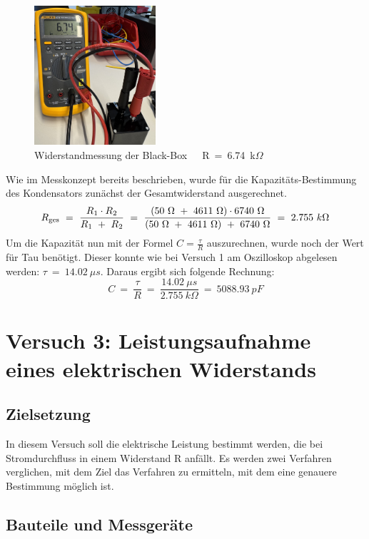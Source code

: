 \documentclass[a4paper,12pt]{article}
\begin{document}
\begin{figure}[H]
    \centering
    \includegraphics[width=0.4\textwidth]{../Quellen/Labor2/Fotos/IMG_3973gezoomt.jpeg}
\caption{Widerstandmessung der Black-Box~~~R~=~6.74~k$\Omega$}
\end{figure}


\noindent Wie im Messkonzept bereits beschrieben, wurde für die Kapazitäts-Bestimmung des Kondensators zunächst der Gesamtwiderstand ausgerechnet.
\[
R\textsubscript{ges}~=~\frac{R\textsubscript{1} \cdot R\textsubscript{2}}{R\textsubscript{1}~+~R\textsubscript{2}}~=~\frac{(50~\Omega~+~4611~\Omega) \cdot 6740~\Omega}{(50~\Omega~+~4611~\Omega)~+~6740~\Omega}~=~2.755~k\Omega
\]
Um die Kapazität nun mit der Formel \(C=\frac{\tau}{R}\) auszurechnen, wurde noch der Wert für Tau benötigt. Dieser konnte wie bei Versuch 1 am Oszilloskop abgelesen werden: $\tau~=~14.02~\mu s$. Daraus ergibt sich folgende Rechnung:
\[
C~=~\frac{\tau}{R}~=~\frac{14.02~\mu s}{2.755~k\Omega}~=~5088.93~pF
\]





\newpage
\section{Versuch 3: Leistungsaufnahme eines elektrischen Widerstands}
\subsection{Zielsetzung}
In diesem Versuch soll die elektrische Leistung bestimmt werden, die bei Stromdurchfluss in
einem Widerstand R anfällt. Es werden zwei Verfahren verglichen, mit dem Ziel das Verfahren zu ermitteln, mit dem eine genauere Bestimmung möglich ist.

\subsection{Bauteile und Messgeräte}
\end{document}
